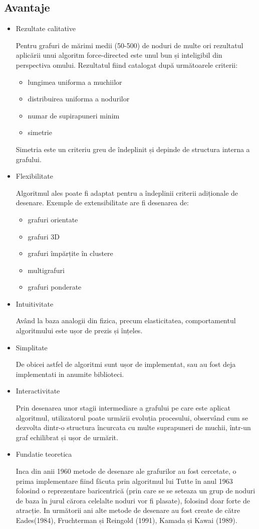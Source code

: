 \subsection{Avantaje}
\begin{itemize}
\item Rezultate calitative

Pentru grafuri de mărimi medii (50-500) de noduri de multe ori rezultatul aplicării unui algoritm force-directed este 
unul bun și inteligibil din perspectiva omului. Rezultatul fiind catalogat după următoarele criterii: 
\begin{itemize}
    \item lungimea uniforma a muchiilor
    \item distribuirea uniforma a nodurilor
    \item numar de supirapuneri minim
    \item simetrie
\end{itemize}

Simetria este un criteriu greu de îndeplinit și depinde de structura interna a grafului.
\item Flexibilitate

Algoritmul ales poate fi adaptat pentru a îndeplinii criterii adiționale de desenare. 
Exemple de extensibilitate are fi desenarea de: 
\begin{itemize}
    \item grafuri orientate
    \item grafuri 3D
    \item grafuri împărțite în clustere
    \item multigrafuri
    \item grafuri ponderate
\end{itemize}
\item Intuitivitate

Având la baza analogii din fizica, precum elasticitatea, comportamentul algoritmului este ușor de prezis și înțeles.
\item Simplitate

De obicei astfel de algoritmi sunt ușor de implementat, sau au fost deja implementati in anumite biblioteci.
\item Interactivitate

Prin desenarea unor stagii intermediare a grafului pe care este aplicat algoritmul, utilizatorul poate urmării evoluția 
procesului, observând cum se dezvolta dintr-o structura încurcata cu multe suprapuneri de muchii, într-un graf echilibrat 
și ușor de urmărit.
\item Fundatie teoretica 

Inca din anii 1960 metode de desenare ale grafurilor au fost cercetate, o prima implementare fiind făcuta 
prin algoritmul lui Tutte în anul 1963 folosind o reprezentare baricentrică (prin care se se seteaza un grup de noduri 
de baza în jurul cărora celelalte noduri vor fi plasate), folosind doar forte de atracție. 
In următorii ani alte metode de desenare au fost create de către Eades(1984), Fruchterman și Reingold (1991), Kamada și Kawai (1989).

\end{itemize}

